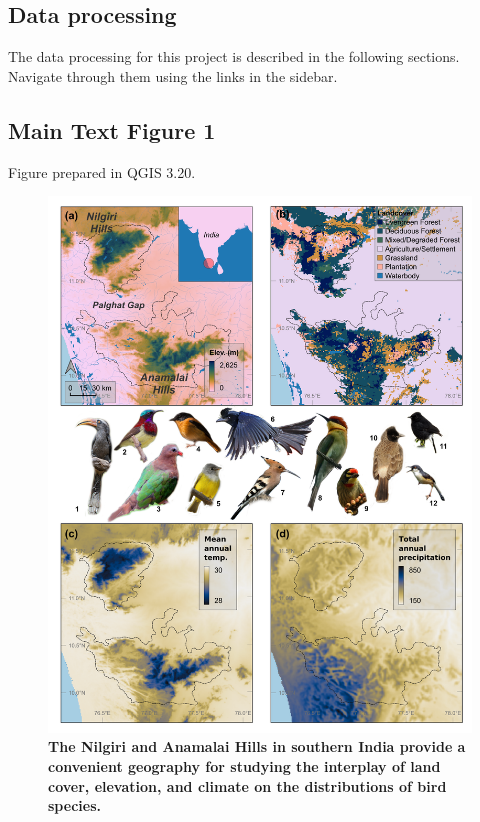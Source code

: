 \documentclass[
]{article}
\begin{document}
\hypertarget{data-processing}{%
\subsection{Data processing}\label{data-processing}}

The data processing for this project is described in the following sections. Navigate through them using the links in the sidebar.

\hypertarget{main-text-figure-1}{%
\subsection{Main Text Figure 1}\label{main-text-figure-1}}

Figure prepared in QGIS 3.20.

\begin{figure}
\centering
\includegraphics{figs/fig_01.png}
\caption{\textbf{The Nilgiri and Anamalai Hills in southern India provide a convenient geography for studying the interplay of land cover, elevation, and climate on the distributions of bird species.}
}
\end{figure}
\end{document}

